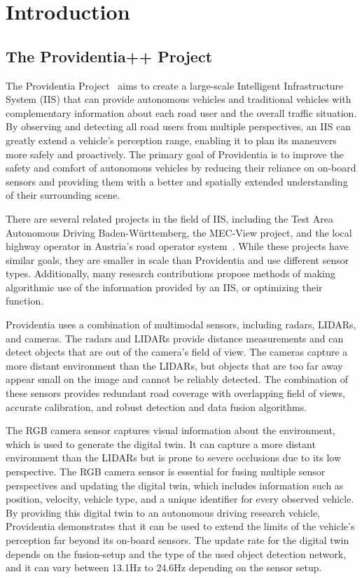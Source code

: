 
\chapter{Introduction}
\label{ch:intro}

\section{The Providentia++ Project}
\label{sec:providentia}

The Providentia Project~\cite{krammer2022providentia} aims to create a large-scale Intelligent Infrastructure System (IIS) that can provide autonomous vehicles and traditional vehicles with complementary information about each road user and the overall traffic situation.
By observing and detecting all road users from multiple perspectives, an IIS can greatly extend a vehicle's perception range, enabling it to plan its maneuvers more safely and proactively.
The primary goal of Providentia is to improve the safety and comfort of autonomous vehicles by reducing their reliance on on-board sensors and providing them with a better and spatially extended understanding of their surrounding scene.

There are several related projects in the field of IIS, including the Test Area Autonomous Driving Baden-Württemberg, the MEC-View project, and the local highway operator in Austria's road operator system~\cite{DBLP:journals/corr/abs-2112-05615}.
While these projects have similar goals, they are smaller in scale than Providentia and use different sensor types.
Additionally, many research contributions propose methods of making algorithmic use of the information provided by an IIS, or optimizing their function.

Providentia uses a combination of multimodal sensors, including radars, LIDARs, and cameras.
The radars and LIDARs provide distance measurements and can detect objects that are out of the camera's field of view.
The cameras capture a more distant environment than the LIDARs, but objects that are too far away appear small on the image and cannot be reliably detected.
The combination of these sensors provides redundant road coverage with overlapping field of views, accurate calibration, and robust detection and data fusion algorithms.

The RGB camera sensor captures visual information about the environment, which is used to generate the digital twin.
It can capture a more distant environment than the LIDARs but is prone to severe occlusions due to its low perspective.
The RGB camera sensor is essential for fusing multiple sensor perspectives and updating the digital twin, which includes information such as position, velocity, vehicle type, and a unique identifier for every observed vehicle.
By providing this digital twin to an autonomous driving research vehicle, Providentia demonstrates that it can be used to extend the limits of the vehicle’s perception far beyond its on-board sensors.
The update rate for the digital twin depends on the fusion-setup and the type of the used object detection network, and it can vary between 13.1Hz to 24.6Hz depending on the sensor setup.

